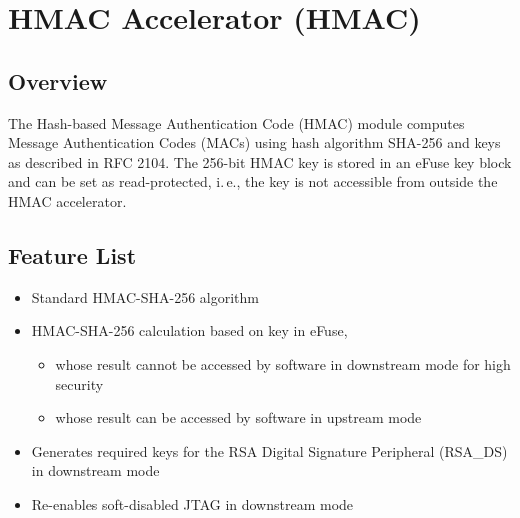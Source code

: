 \documentclass[main\_\_EN.tex]{subfiles}
\begin{document}

\ifglobal
\else
    \listoftodos
    {\let\clearpage\relax \listofdonetodos}
    \tableofcontents
\fi










\hypertarget{hmac}{}
\chapter{HMAC Accelerator (HMAC)}
\label{mod:hmac}

\section{Overview}

The Hash-based Message Authentication Code (HMAC) module computes Message Authentication Codes (MACs) using hash algorithm SHA-256 and keys as described in RFC 2104. The 256-bit HMAC key is stored in an eFuse key block and can be set as read-protected, i.\,e., the key is not accessible from outside the HMAC accelerator.

\section{Feature List}

\begin{itemize}
    \item Standard HMAC-SHA-256 algorithm
    \item HMAC-SHA-256 calculation based on key in eFuse,
    \begin{itemize}
    \item whose result cannot be accessed by software in downstream mode for high security
    \item whose result can be accessed by software in upstream mode
    \end{itemize}
    \item Generates required keys for the RSA Digital Signature Peripheral (RSA\_DS) in downstream mode
    \item Re-enables soft-disabled JTAG in downstream mode
\end{itemize}
\end{document}
